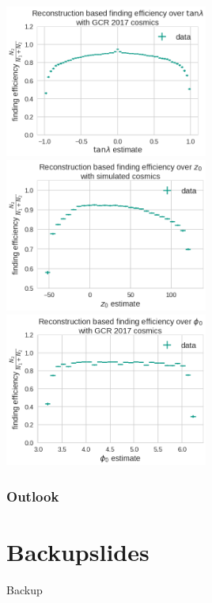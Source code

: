 \documentclass[18pt]{beamer}
\begin{document}
  \begin{frame}
    \begin{center}
      \includegraphics[width=0.5\textwidth]{figures/findeff_tan_lambda_data.png}
      \includegraphics[width=0.5\textwidth]{figures/findeff_z0_data.png}\\
      \includegraphics[width=0.5\textwidth]{figures/findeff_phi0_data.png}
    \end{center}
  \end{frame}
  

  \begin{frame}
    \frametitle{Outlook}
    
  \end{frame}

  \section{Backupslides}
  
  \begin{frame}
    \begin{center}
      \huge Backup
    \end{center}
  \end{frame}
\end{document}
